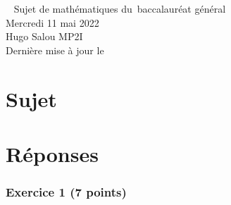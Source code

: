 \documentclass[a4paper]{report}
\begin{document}
	\begin{titlepage}
		\begin{center}
			~
			\vfill
			{\HUGE Sujet de mathématiques du~baccalauréat général}\\
			\vspace{1cm}
			{\LARGE Mercredi 11 mai 2022}\\
			\vfill
			\vfill
			\vfill
			Hugo {\sc Salou} MP2I\\
			{\ssmall Dernière mise à jour le \@date }
		\end{center}
	\end{titlepage}
	\part{Sujet}
	
	\part{Réponses}
	\section{Exercice 1 \hfill (7 points)}
\end{document}
